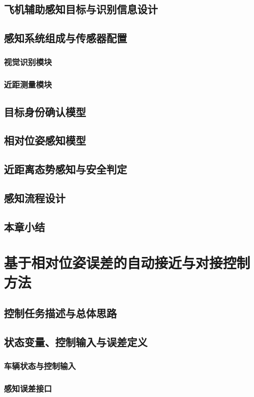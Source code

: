 \documentclass{article}
\begin{document}
\subsection{飞机辅助感知目标与识别信息设计}
\subsection{感知系统组成与传感器配置}
\subsubsection{视觉识别模块}
\subsubsection{近距测量模块}
\subsection{目标身份确认模型}
\subsection{相对位姿感知模型}
\subsection{近距离态势感知与安全判定}
\subsection{感知流程设计}
\subsection{本章小结}

\section{基于相对位姿误差的自动接近与对接控制方法}
\subsection{控制任务描述与总体思路}
\subsection{状态变量、控制输入与误差定义}
\subsubsection{车辆状态与控制输入}
\subsubsection{感知误差接口}
\end{document}
